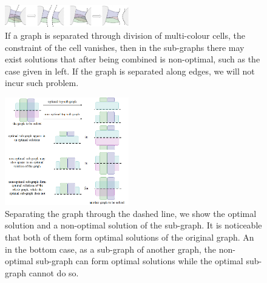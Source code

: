 \documentclass[conference]{IEEEtran}
\begin{document}
\begin{figure}[t]
\centering
\includegraphics[width=0.48\textwidth]{figures/separation_at_edges_2}
\caption{If a graph is separated through division of multi-colour cells, the constraint of the cell vanishes, then in the sub-graphs there may exist solutions that after being combined is non-optimal, such as the case given in left. If the graph is separated along edges, we will not incur such problem. }\label{fig:separation_at_edges}
\end{figure}




\begin{figure}[t]
\centering
\includegraphics[width=0.48\textwidth]{figures/local_combined}
\caption{Separating the graph through the dashed line, we show the optimal solution and a non-optimal solution of the sub-graph. It is noticeable that both of them form optimal solutions of the original graph. An in the bottom case, as a sub-graph of another graph, the non-optimal sub-graph can form optimal solutions while the optimal sub-graph cannot do so. }\label{fig:local_combined}
\end{figure}
\end{document}
